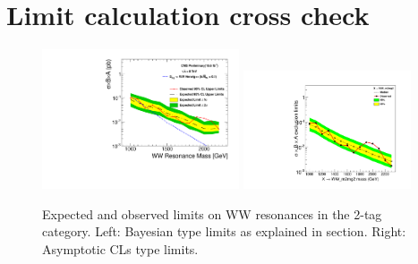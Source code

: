\clearpage

\section{Limit calculation cross check}

\begin{figure}[htb]
\begin{center}
\includegraphics[width=0.52\textwidth,angle=0]{EXO-12-024/figs/appendix/RSGWWherwig_2Tag_limit_obsexp.pdf}
\includegraphics[width=0.44\textwidth,angle=0]{EXO-12-024/figs/appendix/brazilianFlag_acc_WW_m2mg2.pdf}
\end{center}
\caption{Expected and observed limits on WW resonances in the 2-tag category.
Left: Bayesian type limits as explained in section. Right: Asymptotic CLs type limits.}
\label{fig:app}
\end{figure}
